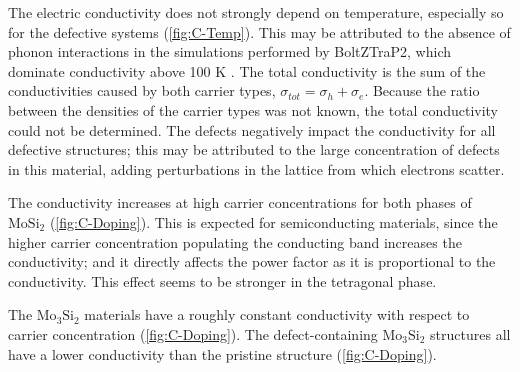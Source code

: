 \documentclass[7.5pt]{article}
\theoremstyle{plain}
\theoremstyle{definition}
\newcommand{\<}{\langle}
\renewcommand{\>}{\rangle}
\begin{document}
\begin{multicols}{2}


\noindent The electric conductivity does not strongly depend on temperature, especially so for the defective systems (\autoref{fig:C-Temp}).  
This may be attributed to the absence of phonon interactions in the simulations performed by BoltZTraP2, which dominate conductivity above 100 K \cite{cdi_proquest_reports_1030752835}. 
The total conductivity is the sum of the conductivities caused by both carrier types, $\sigma_{tot} = \sigma_h + \sigma_e$. 
Because the ratio between the densities of the carrier types was not known, the total conductivity could not be determined. 
The defects negatively impact the conductivity for all defective structures; this may be attributed to the large concentration of defects in this material, adding perturbations in the lattice from which electrons scatter. 

The conductivity increases at high carrier concentrations for both phases of $\text{Mo}\text{Si}_{2}$ (\autoref{fig:C-Doping}).
This is expected for semiconducting materials, since the higher carrier concentration populating the conducting band increases the conductivity; and it directly affects the power factor as it is proportional to the conductivity.
This effect seems to be stronger in the tetragonal phase. 

The $\text{Mo}_{3}\text{Si}_{2}$ materials have a roughly constant conductivity with respect to carrier concentration (\autoref{fig:C-Doping}).
The defect-containing $\text{Mo}_{3}\text{Si}_{2}$ structures all have a lower conductivity than the pristine structure (\autoref{fig:C-Doping}).


\end{multicols}
\end{document}
